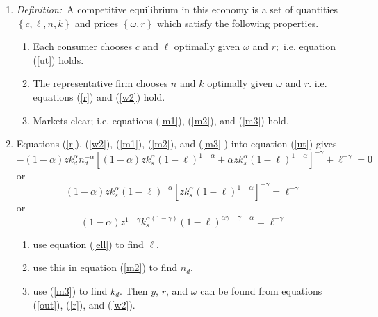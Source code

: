 \documentclass[11pt]{article}
\begin{document}
\begin{enumerate}
\begin{enumerate}
\item \textit{Definition:}\ A competitive equilibrium in this economy is a
set of quantities $\left\{ c,\ell ,n,k\right\} $ and prices $\left\{ \omega
,r\right\} $ which satisfy the following properties.

\begin{enumerate}
\item Each consumer chooses $c$ and $\ell $ optimally given $\omega $ and $%
r; $ i.e. equation (\ref{ut}) holds$.$

\item The representative firm chooses $n$ and $k$ optimally given $\omega $
and $r.$ i.e. equations (\ref{r}) and (\ref{w2}) hold.

\item Markets clear; i.e. equations (\ref{m1}), (\ref{m2}), and (\ref{m3})
hold.
\end{enumerate}

\item Equations (\ref{r}), (\ref{w2}), (\ref{m1}), (\ref{m2}), and (\ref{m3}%
) into equation (\ref{ut}) gives 
\begin{equation*}
-\left( 1-\alpha \right) zk_{d}^{\alpha }n_{d}^{-\alpha }\left[ \left(
1-\alpha \right) zk_{s}^{\alpha }\left( 1-\ell \right) ^{1-\alpha }+\alpha
zk_{s}^{\alpha }\left( 1-\ell \right) ^{1-\alpha }\right] ^{-\gamma }+\ell
^{-\gamma }=0
\end{equation*}%
or%
\begin{equation*}
\left( 1-\alpha \right) zk_{s}^{\alpha }\left( 1-\ell \right) ^{-\alpha } 
\left[ zk_{s}^{\alpha }\left( 1-\ell \right) ^{1-\alpha }\right] ^{-\gamma
}=\ell ^{-\gamma }
\end{equation*}%
or%
\begin{equation}
\left( 1-\alpha \right) z^{1-\gamma }k_{s}^{\alpha \left( 1-\gamma \right)
}\left( 1-\ell \right) ^{\alpha \gamma -\gamma -\alpha }=\ell ^{-\gamma }
\label{ell}
\end{equation}

\begin{enumerate}
\item use equation (\ref{ell}) to find $\ell .$

\item use this in equation (\ref{m2}) to find $n_{d}.$

\item use (\ref{m3}) to find $k_{d}.$ Then $y$, $r$, and $\omega $ can be
found from equations (\ref{out}), (\ref{r}), and (\ref{w2}).


\end{enumerate}
\end{enumerate}
\end{enumerate}
\end{document}
